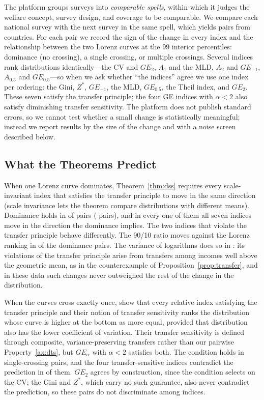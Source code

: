 \documentclass[12pt]{article}
\theoremstyle{plain}
\theoremstyle{definition}
\theoremstyle{remark}
\begin{document}
The platform groups surveys into \emph{comparable spells}, within which it judges the welfare concept, survey design, and coverage to be comparable.
We compare each national survey with the next survey in the same spell, which yields \PipPairs{} pairs from \PipCountries{} countries.
For each pair we record the sign of the change in every index and the relationship between the two Lorenz curves at the 99 interior percentiles: dominance (no crossing), a single crossing, or multiple crossings.
Several indices rank distributions identically---the CV and $GE_2$, $A_1$ and the MLD, $A_2$ and $GE_{-1}$, $A_{0.5}$ and $GE_{0.5}$---so when we ask whether ``the indices'' agree we use one index per ordering: the Gini, $Z^*$, $GE_{-1}$, the MLD, $GE_{0.5}$, the Theil index, and $GE_2$.
These seven satisfy the transfer principle; the four GE indices with $\alpha < 2$ also satisfy diminishing transfer sensitivity.
The platform does not publish standard errors, so we cannot test whether a small change is statistically meaningful; instead we report results by the size of the change and with a noise screen described below.

\subsection{What the Theorems Predict}

When one Lorenz curve dominates, Theorem~\ref{thm:dss} requires every scale-invariant index that satisfies the transfer principle to move in the same direction (scale invariance lets the theorem compare distributions with different means).
Dominance holds in \PipShareDom{} of pairs (\PipNDom{} pairs), and in every one of them all seven indices move in the direction the dominance implies.
The two indices that violate the transfer principle behave differently.
The 90/10 ratio moves against the Lorenz ranking in \PipPNinetyViol{} of the \PipNDom{} dominance pairs.
The variance of logarithms does so in \PipVlViol{}: its violations of the transfer principle arise from transfers among incomes well above the geometric mean, as in the counterexample of Proposition~\ref{prop:transfer}, and in these data such changes never outweighed the rest of the change in the distribution.

When the curves cross exactly once, \citet{Shorrocks1987} show that every relative index satisfying the transfer principle and their notion of transfer sensitivity ranks the distribution whose curve is higher at the bottom as more equal, provided that distribution also has the lower coefficient of variation.
Their transfer sensitivity is defined through composite, variance-preserving transfers rather than our pairwise Property~\ref{ax:dts}, but $GE_\alpha$ with $\alpha < 2$ satisfies both.
The condition holds in \PipNSF{} single-crossing pairs, and the four transfer-sensitive indices contradict the prediction in \PipSFViol{} of them.
$GE_2$ agrees by construction, since the condition selects on the CV; the Gini and $Z^*$, which carry no such guarantee, also never contradict the prediction, so these pairs do not discriminate among indices.
\end{document}
